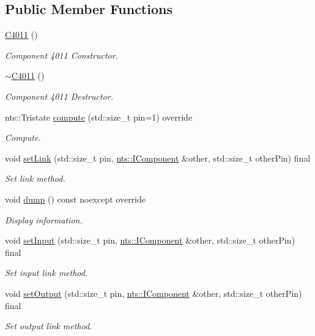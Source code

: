 \subsection*{Public Member Functions}
\begin{DoxyCompactItemize}
\item 
\mbox{\hyperlink{classC4011_a179e783e10dea1e6caa775991ac90793}{C4011}} ()
\begin{DoxyCompactList}\small\item\em Component 4011 Constructor. \end{DoxyCompactList}\item 
\mbox{\label{classC4011_adde3fe4950560251040f5b1710e22d2a}} 
\mbox{\hyperlink{classC4011_adde3fe4950560251040f5b1710e22d2a}{$\sim$\+C4011}} ()
\begin{DoxyCompactList}\small\item\em Component 4011 Destructor. \end{DoxyCompactList}\item 
nts\+::\+Tristate \mbox{\hyperlink{classC4011_a1ed653298a52928ef7406c8f6817cbf3}{compute}} (std\+::size\+\_\+t pin=1) override
\begin{DoxyCompactList}\small\item\em Compute. \end{DoxyCompactList}\item 
void \mbox{\hyperlink{classC4011_a3fe0a0ef26a45324f11099c9b0ffa64c}{set\+Link}} (std\+::size\+\_\+t pin, \mbox{\hyperlink{classnts_1_1IComponent}{nts\+::\+I\+Component}} \&other, std\+::size\+\_\+t other\+Pin) final
\begin{DoxyCompactList}\small\item\em Set link method. \end{DoxyCompactList}\item 
void \mbox{\hyperlink{classC4011_a9aa9544c43493bcdf329aea1e475bfd5}{dump}} () const noexcept override
\begin{DoxyCompactList}\small\item\em Display information. \end{DoxyCompactList}\item 
void \mbox{\hyperlink{classC4011_a35c72f2ad0d4d0d90de38570901bfcf4}{set\+Input}} (std\+::size\+\_\+t pin, \mbox{\hyperlink{classnts_1_1IComponent}{nts\+::\+I\+Component}} \&other, std\+::size\+\_\+t other\+Pin) final
\begin{DoxyCompactList}\small\item\em Set input link method. \end{DoxyCompactList}\item 
void \mbox{\hyperlink{classC4011_a1d0a9e02002f0ad353c3d7357a6a625e}{set\+Output}} (std\+::size\+\_\+t pin, \mbox{\hyperlink{classnts_1_1IComponent}{nts\+::\+I\+Component}} \&other, std\+::size\+\_\+t other\+Pin) final
\begin{DoxyCompactList}\small\item\em Set output link method. \end{DoxyCompactList}\end{DoxyCompactItemize}
